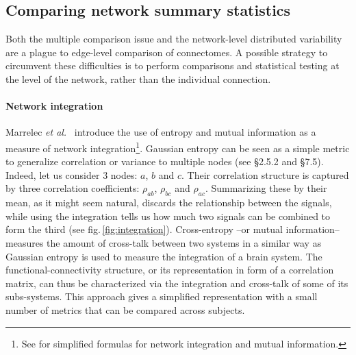 \documentclass[5p]{elsarticle}
\begin{document}

\subsection{Comparing network summary statistics}

Both the multiple comparison issue and the network-level distributed
variability are a plague to edge-level comparison of connectomes. A
possible strategy to circumvent these difficulties is to perform
comparisons and statistical testing at the level of the network, rather
than the individual connection. 

\paragraph{Network integration}
%
Marrelec \emph{et al.}\
\cite{marrelec2008} introduce the use of entropy and mutual information
as a measure of network integration\footnote{See \cite{varoquaux2010c}
for simplified formulas for network integration and mutual information.}.
Gaussian entropy can be seen as a simple metric to generalize correlation
or variance to multiple nodes (see \cite{anderson1958} \S2.5.2 and
\S7.5). Indeed, let us consider 3 nodes: $a$, $b$ and $c$. Their
correlation structure is captured by three correlation coefficients:
$\rho_{ab}$, $\rho_{bc}$ and $\rho_{ac}$. Summarizing these by their
mean, as it might seem natural, discards the relationship between the
signals, while using the integration tells us how much two signals can be
combined to form the third (see fig.\,\ref{fig:integration}). 
Cross-entropy --or mutual information--
\cite{marrelec2008} measures the amount of cross-talk between two
systems in a similar way as Gaussian entropy is used to measure the
integration of a brain
system. The functional-connectivity structure, or its representation in
form of a correlation matrix, can thus be characterized via the
integration and cross-talk of some of its subs-systems. This approach
gives a simplified representation with a small number of metrics that can
be compared across subjects.
\end{document}
